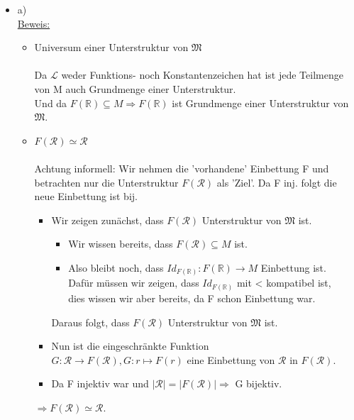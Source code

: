\documentclass[a4paper]{scrartcl}
\begin{document}
    \begin{itemize}
        \item a)\\
            \underline{Beweis:}\\
            \begin{itemize}
                \item Universum einer Unterstruktur von $ \mathfrak{M}$\\
                \\Da $\mathscr{L}$ weder Funktions- noch Konstantenzeichen hat ist jede Teilmenge von M auch Grundmenge einer Unterstruktur.\\
                Und da $F(\mathds{R}) \subseteq M \Rightarrow F(\mathds{R})$ ist Grundmenge einer Unterstruktur von $\mathfrak{M}$.\\
    \item $F(\mathcal{R}) \simeq \mathcal{R}$\\
                \\Achtung informell: Wir nehmen die 'vorhandene' Einbettung F und betrachten nur die Unterstruktur $F(\mathcal{R})$ als 'Ziel'. Da F inj. folgt die neue
                    Einbettung ist bij.\\
                \begin{itemize}
                    \item Wir zeigen zunächst, dass $F(\mathcal{R})$ Unterstruktur von $ \mathfrak{M}$ ist.\\
                        \begin{itemize}
                            \item Wir wissen bereits, dass $F(\mathcal{R}) \subseteq M$ ist.\\
                            \item Also bleibt noch, dass $Id_{F(\mathds{R})}: F(\mathds{R}) \rightarrow M$ Einbettung ist.\\
                                Dafür müssen wir zeigen, dass $Id_{F(\mathds{R})}$ mit < kompatibel ist,\\
                                dies wissen wir aber bereits, da F schon Einbettung war.\\
                        \end{itemize}
                        Daraus folgt, dass $F(\mathcal{R})$ Unterstruktur von $ \mathfrak{M}$ ist.\\
                    \item Nun ist die eingeschränkte Funktion\\
                        $G: \mathcal{R} \rightarrow F(\mathcal{R}), G: r \mapsto F(r)$ eine Einbettung von $\mathcal{R} \text{ in } F(\mathcal{R})$.\\
                    \item Da F injektiv war und $|\mathcal{R}| = |F(\mathcal{R})| \Rightarrow$ G bijektiv.\\
                \end{itemize}
                $\Rightarrow F(\mathcal{R}) \simeq \mathcal{R}$.\\
            \end{itemize}
       

\end{itemize}
\end{document}
